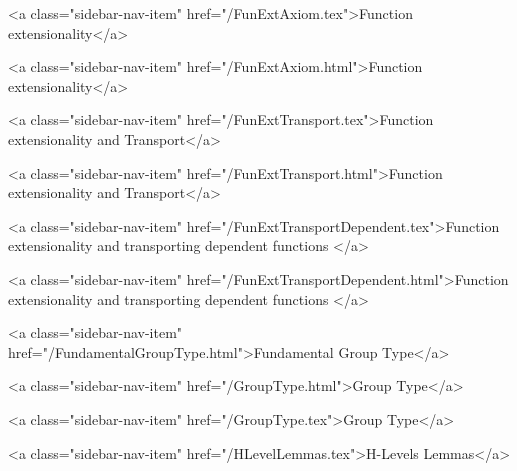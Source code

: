       
    
      
        
          <a class="sidebar-nav-item" href="/FunExtAxiom.tex">Function extensionality</a>
        
      
    
      
        
          <a class="sidebar-nav-item" href="/FunExtAxiom.html">Function extensionality</a>
        
      
    
      
        
          <a class="sidebar-nav-item" href="/FunExtTransport.tex">Function extensionality and Transport</a>
        
      
    
      
        
          <a class="sidebar-nav-item" href="/FunExtTransport.html">Function extensionality and Transport</a>
        
      
    
      
        
          <a class="sidebar-nav-item" href="/FunExtTransportDependent.tex">Function extensionality and transporting dependent functions </a>
        
      
    
      
        
          <a class="sidebar-nav-item" href="/FunExtTransportDependent.html">Function extensionality and transporting dependent functions </a>
        
      
    
      
        
          <a class="sidebar-nav-item" href="/FundamentalGroupType.html">Fundamental Group Type</a>
        
      
    
      
        
          <a class="sidebar-nav-item" href="/GroupType.html">Group Type</a>
        
      
    
      
        
          <a class="sidebar-nav-item" href="/GroupType.tex">Group Type</a>
        
      
    
      
        
          <a class="sidebar-nav-item" href="/HLevelLemmas.tex">H-Levels Lemmas</a>
        
      
    
